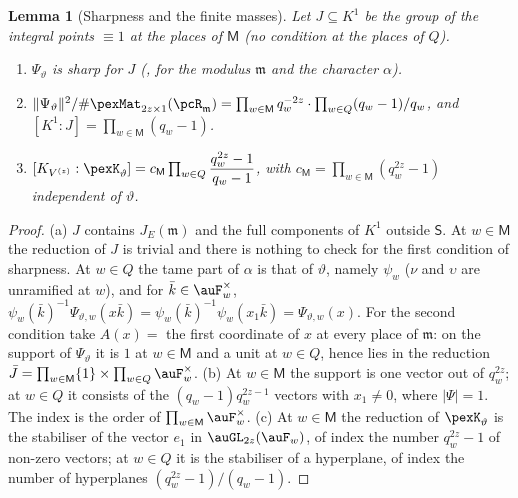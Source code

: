 \documentclass[10pt]{amsart}
\newtheorem{lemma}[theorem]{Lemma}
\theoremstyle{definition}
\theoremstyle{remark}
\begin{document}
\begin{lemma}[Sharpness and the finite masses]\label{pex:sharp}
Let $J\subseteq K^1$ be the group of the integral points $\equiv1$ at the places of $\mathsf M$
(no condition at the places of $Q$).
\begin{enumerate}
\item[(a)] $\Psi_\vartheta$ is sharp for $J$ ({\cite[Definition~2.15]{P53}}, for the modulus
$\mathfrak m$ and the character $\alpha$).
\item[(b)] $\|\Psi_\vartheta\|^2/\#\pexMat_{2z\times1}(\pcR_{\mathfrak m})=\prod_{w\in\mathsf M}q_w^{-2z}
\cdot\prod_{w\in Q}(q_w-1)/q_w$, and $[K^1:J]=\prod_{w\in\mathsf M}(q_w-1)$.
\item[(c)] $[K_{V^{(z)}}:\pexK_\vartheta]=c_{\mathsf M}\prod_{w\in Q}\dfrac{q_w^{2z}-1}{q_w-1}$, with
$c_{\mathsf M}=\prod_{w\in\mathsf M}(q_w^{2z}-1)$ independent of $\vartheta$.
\end{enumerate}
\end{lemma}
\begin{proof}
(a) $J$ contains $J_{E}(\mathfrak m)$ and the full components of $K^1$ outside $\mathsf S$. At
$w\in\mathsf M$ the reduction of $J$ is trivial and there is nothing to check for the first condition
of sharpness. At $w\in Q$ the tame part of $\alpha$ is that of $\vartheta$, namely $\psi_w$ ($\nu$
and $\upsilon$ are unramified at $w$), and for $\bar k\in\auF_w^\times$,
$\psi_w(\bar k)^{-1}\Psi_{\vartheta,w}(x\bar k)=\psi_w(\bar k)^{-1}\psi_w(x_1\bar k)=\Psi_{\vartheta,w}
(x)$. For the second condition take $A(x)=$ the first coordinate of $x$ at every place of
$\mathfrak m$: on the support of $\Psi_\vartheta$ it is $1$ at $w\in\mathsf M$ and a unit at $w\in Q$,
hence lies in the reduction $\bar J=\prod_{w\in\mathsf M}\{1\}\times\prod_{w\in Q}\auF_w^\times$.
(b) At $w\in\mathsf M$ the support is one vector out of $q_w^{2z}$; at $w\in Q$ it consists of the
$(q_w-1)q_w^{2z-1}$ vectors with $x_1\ne0$, where $|\Psi|=1$. The index is the order of
$\prod_{w\in\mathsf M}\auF_w^\times$. (c) At $w\in\mathsf M$ the reduction of $\pexK_\vartheta$ is
the stabiliser of the vector $e_1$ in $\auGL_{2z}(\auF_w)$, of index the number $q_w^{2z}-1$ of
non-zero vectors; at $w\in Q$ it is the stabiliser of a hyperplane, of index the number of
hyperplanes $(q_w^{2z}-1)/(q_w-1)$.
\end{proof}
\end{document}
